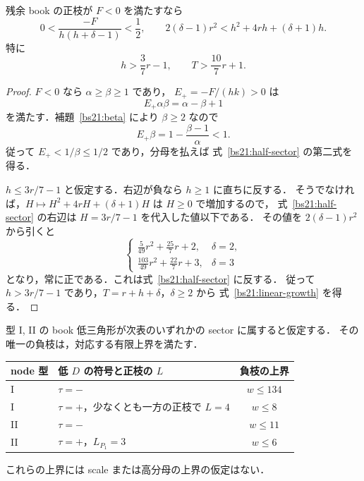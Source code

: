 \begin{lemma}
\label{bs21:growth}
残余 book の正枝が $F<0$ を満たすなら
\begin{equation}\label{bs21:half-sector}
 0<\frac{-F}{h(h+\delta-1)}<\frac12,
 \qquad
 2(\delta-1)r^2<h^2+4rh+(\delta+1)h.
\end{equation}
特に
\begin{equation}\label{bs21:linear-growth}
 h>\frac37r-1,
 \qquad T>\frac{10}{7}r+1.
\end{equation}
\end{lemma}

\begin{proof}
$F<0$ なら $\alpha\ge\beta\ge1$ であり，
$E_+=-F/(hk)>0$ は
\[
 E_+\alpha\beta=\alpha-\beta+1
\]
を満たす．補題~\ref{bs21:beta} により $\beta\ge2$ なので
\[
 E_+\beta=1-\frac{\beta-1}{\alpha}<1.
\]
従って $E_+<1/\beta\le1/2$ であり，分母を払えば
式~\eqref{bs21:half-sector} の第二式を得る．

$h\le3r/7-1$ と仮定する．右辺が負なら $h\ge1$ に直ちに反する．
そうでなければ，$H\mapsto H^2+4rH+(\delta+1)H$ は $H\ge0$ で増加するので，
式~\eqref{bs21:half-sector} の右辺は $H=3r/7-1$ を代入した値以下である．
その値を $2(\delta-1)r^2$ から引くと
\[
 \begin{cases}
 \displaystyle\frac5{49}r^2+\frac{25}{7}r+2,&\delta=2,\\[3pt]
 \displaystyle\frac{103}{49}r^2+\frac{22}{7}r+3,&\delta=3
 \end{cases}
\]
となり，常に正である．これは式~\eqref{bs21:half-sector} に反する．
従って $h>3r/7-1$ であり，$T=r+h+\delta$，$\delta\ge2$ から
式~\eqref{bs21:linear-growth} を得る．
\end{proof}

\begin{proposition}
\label{bs21:bounded-sectors}
型 I, II の book 低三角形が次表のいずれかの sector に属すると仮定する．
その唯一の負枝は，対応する有限上界を満たす．
\begin{center}
\begin{tabular}{llc}
node 型 & 低 $D$ の符号と正枝の $L$ & 負枝の上界\\
\hline
I & $\tau=-$ & $w\le134$\\
I & $\tau=+$，少なくとも一方の正枝で $L=4$ & $w\le8$\\
II & $\tau=-$ & $w\le11$\\
II & $\tau=+$，$L_{P_1}=3$ & $w\le6$\\
\end{tabular}
\end{center}
これらの上界には scale または高分母の上界の仮定はない．
\end{proposition}

